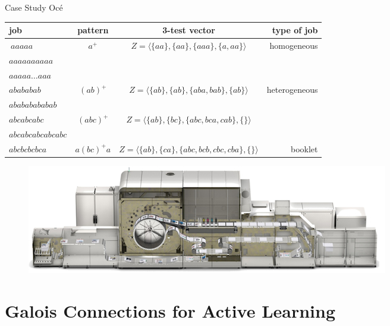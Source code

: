 \documentclass[pdf]{beamer}
\begin{document}
\begin{frame}{Case Study Oc\'e}
\begin{center}
\tiny
\begin{tabular}{lccr}
\toprule
job & pattern   & 3-test vector & type of job \\ 
\midrule
$\ aaaaa$ 						& \multirow{3}{*}{$a^+$}  	& \multirow{3}{*}{$Z=\langle \{aa\},\{aa\},\{aaa\},\{a,aa\} \rangle$}	& \multirow{3}{*}{homogeneous} \\
\cline{1-1}
\rule{0pt}{2.5ex} $aaaaaaaaaa$ & 						 	&					&				\\
\cline{1-1}
\rule{0pt}{2.5ex} $aaaaa\ldots aaa$ &					&						&			\\
\cline{1-4}
\rule{0pt}{2.5ex} $abababab$	& \multirow{2}{*}{$(ab)^+$} & \multirow{2}{*}{$Z=\langle \{ab\},\{ab\},\{aba,bab\},\{ab\} \rangle$}	& \multirow{4}{*}{heterogeneous} 			\\
\cline{1-1}
\rule{0pt}{2.5ex} $abababababab$	&					& 			&						\\
\cline{1-3}
\rule{0pt}{2.5ex} $abcabcabc$	& \multirow{2}{*}{$(abc)^+$}& 		\multirow{2}{*}{$Z=\langle \{ab\},\{bc\},\{abc,bca,cab\},\{\} \rangle$}						&	\\
\cline{1-1}
\rule{0pt}{2.5ex} $abcabcabcabcabc$ & 					&			&						\\
\cline{1-4}
\rule{0pt}{2.5ex} $abcbcbcbca$ & $a(bc)^+a$ 				& $Z=\langle \{ab\},\{ca\},\{abc,bcb,cbc,cba\},\{\} \rangle$  & booklet \\
\bottomrule
\end{tabular}

\begin{figure}
\vspace{0.3cm}
\includegraphics[width=0.7\linewidth]{2015-03-01-varioprint-i300-2.jpg}
\end{figure}

\end{center}

\end{frame}

\section{Galois Connections for Active Learning}
\end{document}
